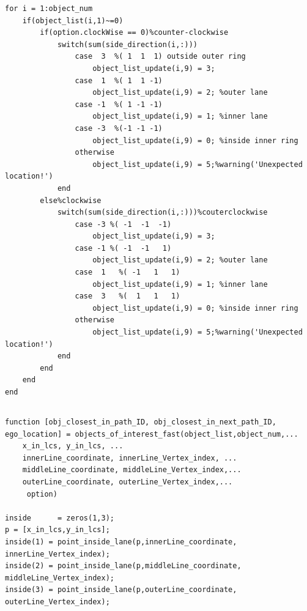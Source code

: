 \documentclass[12pt,a4paper]{article}
\newcommand{\zhiv}{\fontsize{12pt}{18pt}\selectfont}      %
\begin{document}
{{{\begin{verbatim}
for i = 1:object_num
    if(object_list(i,1)~=0)
        if(option.clockWise == 0)%counter-clockwise
            switch(sum(side_direction(i,:)))
                case  3  %( 1  1  1) outside outer ring
                    object_list_update(i,9) = 3; 
                case  1  %( 1  1 -1)
                    object_list_update(i,9) = 2; %outer lane 
                case -1  %( 1 -1 -1)
                    object_list_update(i,9) = 1; %inner lane
                case -3  %(-1 -1 -1)
                    object_list_update(i,9) = 0; %inside inner ring
                otherwise
                    object_list_update(i,9) = 5;%warning('Unexpected location!')
            end
        else%clockwise
            switch(sum(side_direction(i,:)))%couterclockwise
                case -3 %( -1  -1  -1)
                    object_list_update(i,9) = 3; 
                case -1 %( -1  -1   1)
                    object_list_update(i,9) = 2; %outer lane 
                case  1   %( -1   1   1)
                    object_list_update(i,9) = 1; %inner lane
                case  3   %(  1   1   1)
                    object_list_update(i,9) = 0; %inside inner ring
                otherwise
                    object_list_update(i,9) = 5;%warning('Unexpected location!')
            end
        end
    end
end

\end{verbatim}

{\subsection{\textbf{\song\zhiv{地标搜索模块 m函数}}}}

\begin{verbatim}
function [obj_closest_in_path_ID, obj_closest_in_next_path_ID, ego_location] = objects_of_interest_fast(object_list,object_num,...
    x_in_lcs, y_in_lcs, ...
    innerLine_coordinate, innerLine_Vertex_index, ...
    middleLine_coordinate, middleLine_Vertex_index,...
    outerLine_coordinate, outerLine_Vertex_index,...
     option)

inside      = zeros(1,3);
p = [x_in_lcs,y_in_lcs];
inside(1) = point_inside_lane(p,innerLine_coordinate, innerLine_Vertex_index);
inside(2) = point_inside_lane(p,middleLine_coordinate, middleLine_Vertex_index);
inside(3) = point_inside_lane(p,outerLine_coordinate, outerLine_Vertex_index);


\end{verbatim}}}}
\end{document}
